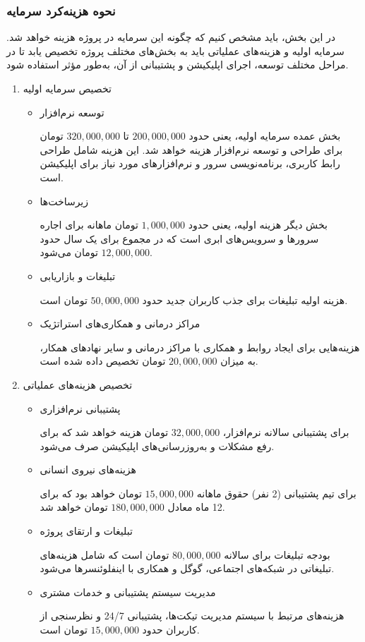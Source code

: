 \documentclass[dvipsnames, svgnames, x11names, 11pt]{article}
\begin{document}
\subsubsection{نحوه هزینه‌کرد سرمایه }
در این بخش، باید مشخص کنیم که چگونه این سرمایه در پروژه هزینه خواهد شد. سرمایه اولیه و هزینه‌های عملیاتی باید به بخش‌های مختلف پروژه تخصیص یابد تا در مراحل مختلف توسعه، اجرای اپلیکیشن و پشتیبانی از آن، به‌طور مؤثر استفاده شود.

\begin{enumerate}
\item 
تخصیص سرمایه اولیه

\begin{itemize}
\item 
توسعه نرم‌افزار

بخش عمده سرمایه اولیه، یعنی حدود
$200,000,000$
تا
$320,000,000$
تومان برای طراحی و توسعه نرم‌افزار هزینه خواهد شد. این هزینه شامل طراحی رابط کاربری، برنامه‌نویسی سرور و نرم‌افزارهای مورد نیاز برای اپلیکیشن است.

\item 
زیرساخت‌ها

بخش دیگر هزینه اولیه، یعنی حدود 
$1,000,000$
تومان ماهانه برای اجاره سرورها و سرویس‌های ابری است که در مجموع برای یک سال حدود
$12,000,000$
تومان می‌شود.

\item 
تبلیغات و بازاریابی

هزینه اولیه تبلیغات برای جذب کاربران جدید حدود
$50,000,000 $
تومان است.

\item 
مراکز درمانی و همکاری‌های استراتژیک

هزینه‌هایی برای ایجاد روابط و همکاری با مراکز درمانی و سایر نهادهای همکار، به میزان 
$20,000,000$
تومان تخصیص داده شده است.
\end{itemize}

\item 
تخصیص هزینه‌های عملیاتی

\begin{itemize}
\item 
پشتیبانی نرم‌افزاری

برای پشتیبانی سالانه نرم‌افزار،
$32,000,000$
تومان هزینه خواهد شد که برای رفع مشکلات و به‌روزرسانی‌های اپلیکیشن صرف می‌شود.

\item 
هزینه‌های نیروی انسانی

برای تیم پشتیبانی (2 نفر) حقوق ماهانه
$15,000,000$
تومان خواهد بود که برای 12 ماه معادل
$180,000,000$
تومان خواهد شد.

\item 
تبلیغات و ارتقای پروژه

بودجه تبلیغات برای سالانه 
$80,000,000$
تومان است که شامل هزینه‌های تبلیغاتی در شبکه‌های اجتماعی، گوگل و همکاری با اینفلوئنسرها می‌شود.

\item 
مدیریت سیستم پشتیبانی و خدمات مشتری

هزینه‌های مرتبط با سیستم مدیریت تیکت‌ها، پشتیبانی 24/7 و نظرسنجی از کاربران حدود
$15,000,000$
تومان است.
\end{itemize}
\end{enumerate}
\end{document}
